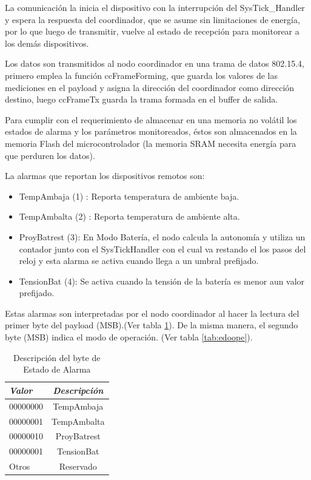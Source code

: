 {La comunicación la inicia el dispositivo con la interrupción del SysTick\_Handler y espera la respuesta del coordinador, que se asume sin limitaciones de energía, por lo que luego de transmitir, vuelve al estado de recepción para monitorear a los demás dispositivos.

Los datos son transmitidos al nodo coordinador en una trama de datos 802.15.4, primero emplea la función ccFrameForming, que guarda los valores de las mediciones en el payload y asigna la dirección del coordinador como dirección destino, luego ccFrameTx guarda la trama formada en el buffer de salida.

Para cumplir con el requerimiento de almacenar en una memoria no volátil los estados de alarma y los parámetros monitoreados, éstos son almacenados en la memoria Flash del microcontrolador (la memoria SRAM necesita energía para que perduren los datos). 

\noindent La alarmas que reportan los dispositivos remotos son:
	\begin{itemize}
	\item TempAmbaja (1) : Reporta temperatura de ambiente baja.
	\item TempAmbalta (2) : Reporta temperatura de ambiente alta.
	\item ProyBatrest (3): En Modo Batería, el nodo calcula la autonomía y utiliza un contador junto con el SysTickHandler con el cual va restando el los pasos del reloj y esta alarma se activa cuando llega a un umbral prefijado.
	\item TensionBat (4): Se activa cuando la tensión de la batería es menor aun valor prefijado.
	\end{itemize}
	
Estas alarmas son interpretadas por el nodo coordinador al hacer la lectura del primer byte del payload (MSB).(Ver tabla \ref{tab:edoalarm}). De la misma manera, el segundo byte (MSB) indica el modo de operación. (Ver tabla \ref{tab:edoope}).

\vspace{10px}
\begin{table}[ht]
	\centering
	\caption{Descripción del byte de Estado de Alarma}
	\begin{tabular}{@{} l *1c @{}}    \toprule
		\emph{\textbf{Valor}} & \emph{\textbf{Descripción}}\\
		\midrule
		00000000 & TempAmbaja\\	
		00000001 & TempAmbalta\\
		00000010 & ProyBatrest\\
		00000001 & TensionBat\\
		Otros & Reservado\\
		\bottomrule
		\hline
	\end{tabular}
	\label{tab:edoalarm}
\end{table}

}
